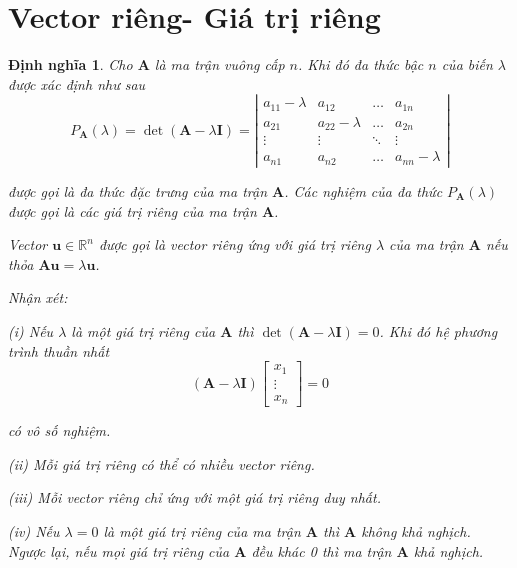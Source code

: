 \documentclass[12pt,a4paper,oneside]{report}
\newtheorem{dl}{Định lý}[section]
\newtheorem{dn}{Định nghĩa}[section]
\numberwithin{equation}{section}
\begin{document}

\section{Vector riêng- Giá trị riêng}
\begin{dn}\rm
 Cho $\mathbf{A}$ là ma trận vuông cấp $n$. Khi đó đa thức bậc $n$ của biến $\lambda$ được xác định như sau
 $$
 P_{\mathbf{A}}(\lambda)=\operatorname{det}(\mathbf{A}-\lambda \mathbf{I})=\left|\begin{array}{cccc}
 	a_{11}-\lambda & a_{12} & \ldots & a_{1 n} \\
 	a_{21} & a_{22}-\lambda & \ldots & a_{2 n} \\
 	\vdots & \vdots & \ddots & \vdots \\
 	a_{n 1} & a_{n 2} & \ldots & a_{n n}-\lambda
 \end{array}\right|
 $$
 
 được gọi là đa thức đặc trưng của ma trận $\mathbf{A}$. Các nghiệm của đa thức $P_{\mathbf{A}}(\lambda)$ được gọi là các giá trị riêng của ma trận $\mathbf{A}$.
 
 Vector $\mathbf{u} \in \mathbb{R}^{n}$ được gọi là vector riêng ứng với giá trị riêng $\lambda$ của ma trận $\mathbf{A}$ nếu thỏa $\mathbf{A u}=\lambda \mathbf{u}$.
 
 Nhận xét:
 
 (i) Nếu $\lambda$ là một giá trị riêng của $\mathbf{A}$ thì $\operatorname{det}(\mathbf{A}-\lambda \mathbf{I})=0$. Khi đó hệ phương trình thuần nhất 
 $$
 (\mathbf{A}-\lambda \mathbf{I})\left[\begin{array}{c}
 	x_{1} \\
 	\vdots \\
 	x_{n}
 \end{array}\right]=0
 $$
 
 có vô số nghiệm.
 
 (ii) Mỗi giá trị riêng có thể có nhiều vector riêng.
 
 (iii) Mỗi vector riêng chỉ ứng với một giá trị riêng duy nhất.
 
 (iv) Nếu $\lambda=0$ là một giá trị riêng của ma trận $\mathbf{A}$ thì $\mathbf{A}$ không khả nghịch. Ngược lại, nếu mọi giá trị riêng của $\mathbf{A}$ đều khác 0 thì ma trận $\mathbf{A}$ khả nghịch. 
\end{dn}
\end{document}

